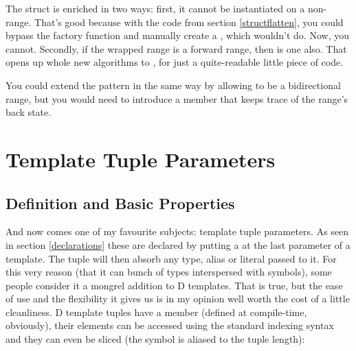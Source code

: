 The struct is enriched in two ways: first, it cannot be instantiated on a non-range. That's good because with the code from section \ref{structflatten}, you could bypass the factory function and manually create a , which wouldn't do. Now, you cannot. Secondly, if the wrapped range is a forward range, then  is one also. That opens up whole new algorithms to , for just a quite-readable little piece of code.

You could extend the pattern in the same way by allowing  to be a bidirectional range, but you would need to introduce a  member that keeps trace of the range's back state.


\section{Template Tuple Parameters}\label{tuples}

\subsection{Definition and Basic Properties}\label{tupleproperties}

And now comes one of my favourite subjects: template tuple parameters. As seen in section \ref{declarations} these are declared by putting a  at the last parameter of a template. The tuple will then absorb any type, alias or literal passed to it. 
For this very reason (that it can bunch of types interspersed with symbols), some people consider it a mongrel addition to D templates. That is true, but the ease of use and the flexibility it gives us is in my opinion well worth the cost of a little cleanliness.
D template tuples have a  member (defined at compile-time, obviously), their elements can be accessed using the standard indexing syntax and they can even be sliced (the \DD{\$} symbol is aliased to the tuple length):


